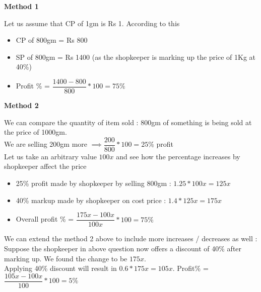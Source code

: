 
\begin{multicols}{2}
    \textbf{Method 1}
    
    Let us assume that CP of 1gm is Rs 1. According to this
    \begin{itemize}
        \item CP of 800gm = Rs 800
        \item SP of 800gm = Rs 1400 (as the shopkeeper is marking up the price of 1Kg at 40\%)
        \item Profit \% = $\dfrac{1400 - 800}{800} * 100 = 75\% $
    \end{itemize}
    
    \columnbreak

    \textbf{Method 2}
    
    We can compare the quantity of item sold : 800gm of something is being sold at the price of 1000gm. \\
    
    We are selling 200gm more $\implies \dfrac{200}{800} * 100 = 25\% $ profit \\

    Let us take an arbitrary value $100x$ and see how the percentage increases by shopkeeper affect the price
    \begin{itemize}
        \item 25\% profit made by shopkeeper by selling 800gm : $1.25 * 100x = 125x$
        \item 40\% markup made by shopkeeper on cost price : $1.4 * 125x = 175x$
        \item Overall profit \% = $\dfrac{175x - 100x}{100x} * 100 = 75\%$
    \end{itemize}
\end{multicols}

\begin{EXTRA-LEARNING}
    We can extend the method 2 above to include more increases / decreases as well : Suppose the shopkeeper in above question now offers a discount of 40\% after marking up. We found the change to be $175x$. \\
    
    Applying 40\% discount will result in $0.6 * 175x = 105x$. Profit\% = $\dfrac{105x - 100x}{100} * 100 = 5\%$
\end{EXTRA-LEARNING}